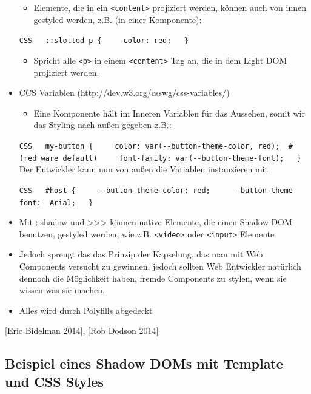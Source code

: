 \begin{itemize}
  \begin{itemize}
  \tightlist
  \item
    Elemente, die in ein \texttt{\textless{}content\textgreater{}}
    projiziert werden, können auch von innen gestyled werden, z.B. (in
    einer Komponente):
  \end{itemize}

  \texttt{CSS\ \ \ ::slotted\ p\ \{\ \ \ \ \ color:\ red;\ \ \ \}}

  \begin{itemize}
  \tightlist
  \item
    Spricht alle \texttt{\textless{}p\textgreater{}} in einem
    \texttt{\textless{}content\textgreater{}} Tag an, die in dem Light
    DOM projiziert werden.
  \end{itemize}
\item
  CCS Variablen (http://dev.w3.org/csswg/css-variables/)

  \begin{itemize}
  \tightlist
  \item
    Eine Komponente hält im Inneren Variablen für das Aussehen, somit
    wir das Styling nach außen gegeben z.B.:
  \end{itemize}

  \texttt{CSS\ \ \ my-button\ \{\ \ \ \ \ color:\ var(-\/-button-theme-color,\ red);\ \ \#(red\ wäre\ default)\ \ \ \ \ font-family:\ var(-\/-button-theme-font);\ \ \ \}}
  Der Entwickler kann nun von außen die Variablen instanzieren mit

  \texttt{CSS\ \ \ \#host\ \{\ \ \ \ \ -\/-button-theme-color:\ red;\ \ \ \ \ -\/-button-theme-font:\ \ Arial;\ \ \ \}}
\item
  Mit ::shadow und \textgreater{}\textgreater{}\textgreater{} können
  native Elemente, die einen Shadow DOM benutzen, gestyled werden, wie
  z.B. \texttt{\textless{}video\textgreater{}} oder
  \texttt{\textless{}input\textgreater{}} Elemente
\item
  Jedoch sprengt das das Prinzip der Kapselung, das man mit Web
  Components versucht zu gewinnen, jedoch sollten Web Entwickler
  natürlich dennoch die Möglichkeit haben, fremde Components zu stylen,
  wenn sie wissen was sie machen.
\item
  Alles wird durch Polyfills abgedeckt
\end{itemize}

{[}Eric Bidelman 2014{]}, {[}Rob Dodson 2014{]}

\subsection{Beispiel eines Shadow DOMs mit Template und CSS
Styles}\label{beispiel-eines-shadow-doms-mit-template-und-css-styles}

